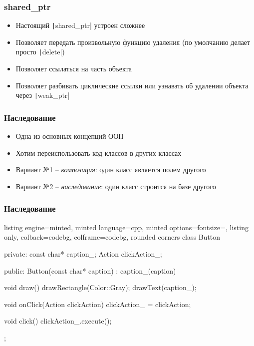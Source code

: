 \documentclass[10pt]{beamer}
\begin{document}
\begin{frame}[fragile]
\frametitle{shared\_ptr}
\begin{itemize}
\item Настоящий \texttt|shared_ptr| устроен сложнее
\pause
\item Позволяет передать произвольную функцию удаления (по умолчанию делает просто \texttt|delete|)
\pause
\item Позволяет ссылаться на часть объекта
\pause
\item Позволяет разбивать циклические ссылки или узнавать об удалении объекта через \texttt|weak_ptr|
\end{itemize}
\end{frame}

\begin{frame}[fragile]
\frametitle{Наследование}
\begin{itemize}
\item Одна из основных концепций ООП
\pause
\item Хотим переиспользовать код классов в других классах
\pause
\item Вариант №1 -- \textit{композиция}: один класс является полем другого
\pause
\item Вариант №2 -- \textit{наследование}: один класс строится на базе другого
\end{itemize}
\end{frame}

\begin{frame}[fragile]
\frametitle{Наследование}
\begin{itemize}
\begin{tcblisting}{listing engine=minted, minted language=cpp, minted options={fontsize=\scriptsize}, listing only, colback=codebg, colframe=codebg, rounded corners}
class Button {
private:
  const char* caption_;
  Action clickAction_;

public:
  Button(const char* caption)
    : caption_(caption)
  {}

  void draw() {
    drawRectangle(Color::Gray);
    drawText(caption_);
  }

  void onClick(Action clickAction) {
    clickAction_ = clickAction;
  }

  void click() {
    clickAction_.execute();
  }
};
\end{tcblisting}
\end{itemize}
\end{frame}
\end{document}
